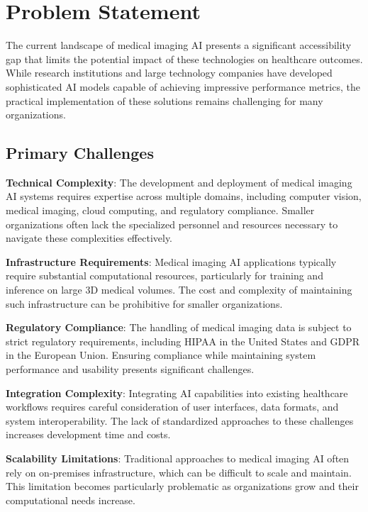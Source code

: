 \documentclass[12pt,a4paper]{article}
\begin{document}
\section{Problem Statement}

The current landscape of medical imaging AI presents a significant accessibility gap that limits the potential impact of these technologies on healthcare outcomes. While research institutions and large technology companies have developed sophisticated AI models capable of achieving impressive performance metrics, the practical implementation of these solutions remains challenging for many organizations.

\subsection{Primary Challenges}

\textbf{Technical Complexity}: The development and deployment of medical imaging AI systems requires expertise across multiple domains, including computer vision, medical imaging, cloud computing, and regulatory compliance. Smaller organizations often lack the specialized personnel and resources necessary to navigate these complexities effectively.

\textbf{Infrastructure Requirements}: Medical imaging AI applications typically require substantial computational resources, particularly for training and inference on large 3D medical volumes. The cost and complexity of maintaining such infrastructure can be prohibitive for smaller organizations.

\textbf{Regulatory Compliance}: The handling of medical imaging data is subject to strict regulatory requirements, including HIPAA in the United States and GDPR in the European Union. Ensuring compliance while maintaining system performance and usability presents significant challenges.

\textbf{Integration Complexity}: Integrating AI capabilities into existing healthcare workflows requires careful consideration of user interfaces, data formats, and system interoperability. The lack of standardized approaches to these challenges increases development time and costs.

\textbf{Scalability Limitations}: Traditional approaches to medical imaging AI often rely on on-premises infrastructure, which can be difficult to scale and maintain. This limitation becomes particularly problematic as organizations grow and their computational needs increase.
\end{document}
